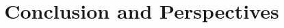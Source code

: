 \documentclass{article}
\title{Conclusion and Perspectives}
\date{}
\begin{document}
	\maketitle
	\setcounter{tocdepth}{5}
	\tableofcontents
	
	\begin{abstract}
		
	\end{abstract}
	
	
	
	
	
	
\end{document}
